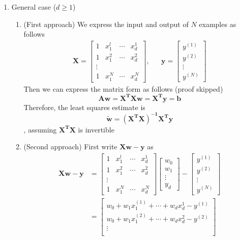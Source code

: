 \documentclass[11pt]{article}
\begin{document}
\begin{enumerate}
\item General case ($d \geq 1$)
\begin{enumerate}
\item (First approach) We express the input and output of $N$ examples as follows
\begin{align*}
\mathbf{X} = \begin{bmatrix}
1& x_1 ^{l}&\cdots & x_{d}^{1}\\
1& x_1 ^{2}&\cdots & x_{d}^{2}\\
\vdots\\
1& x_1 ^{N}&\cdots & x_{d}^{N}
\end{bmatrix}, &&\mathbf{y} = \begin{bmatrix}
y^{(1)}\\
y^{(2)}\\
\vdots\\
y^{(N)}
\end{bmatrix}
\end{align*}
Then we can express the matrix form as follows (proof skipped)
$$\mathbf{A w = X^T X w = X^T y = b}$$
Therefore, the least squares estimate is $$\tilde{\mathbf{w}} = \mathbf{(X^T X)^{-1} X^T y}$$, assuming $\mathbf{X^T X}$ is invertible
\item (Second approach) First write $\mathbf{X w - y}$ as
\begin{align*}
\mathbf{Xw - y} &= \begin{bmatrix}
1& x_1 ^{l}&\cdots & x_{d}^{1}\\
1& x_1 ^{2}&\cdots & x_{d}^{2}\\
\vdots\\
1& x_1 ^{N}&\cdots & x_{d}^{N}
\end{bmatrix} \begin{bmatrix}
w_0\\
w_1\\
\vdots\\
y_d
\end{bmatrix} - \begin{bmatrix}
y^{(1)}\\
y^{(2)}\\
\vdots\\
y^{(N)}
\end{bmatrix}\\
&= \begin{bmatrix}
w_0 + w_1 x_1 ^{(1)} + \cdots + w_d x_d ^{1} - y^{(1)}\\
w_0 + w_1 x_1 ^{(2)} + \cdots + w_d x_d ^{2} - y^{(2)}\\
\vdots\\

\end{bmatrix}
\end{align*}
\end{enumerate}
\end{enumerate}
\end{document}
